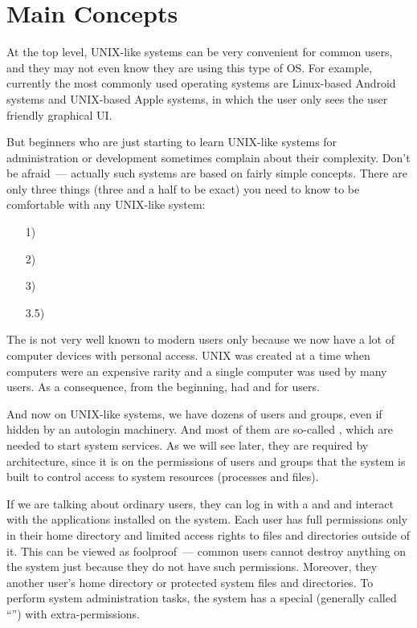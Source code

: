 \section*{Main Concepts}

At the top level, UNIX-like systems can be very convenient for common
users, and they may not even know they are using this type of OS.
For example, currently the most commonly used operating systems are
Linux-based Android systems and UNIX-based Apple systems, in which
the user only sees the user friendly graphical UI.

But beginners who are just starting to learn UNIX-like systems
for administration or development sometimes complain about their complexity.
Don't be afraid~--- actually such systems are based on fairly simple concepts.
There are only three things (three and a half to be exact) you
need to know to be comfortable with any UNIX-like system:
\begin{itemize}
\item[1)] 
\item[2)] 
\item[3)] 
\item[3.5)] 
\end{itemize}

The  is not very well known to modern users only because we now
have a lot of computer devices with personal access. UNIX was created at a time
when computers were an expensive rarity and a single computer was used
by many users. As a consequence, from the beginning,  had
 and 
for users.

And now on UNIX-like systems, we have dozens of users and groups,
even if hidden by an autologin machinery. And most of them are so-called
, which are needed to start system services. As we will see
later, they are required by architecture, since it is on the permissions
of users and groups that the system is built to control access to system
resources (processes and files).

If we are talking about ordinary users, they can log in with a 
and  and interact with the applications installed on the system.
Each user has full permissions only in their home directory and limited
access rights to files and directories outside of it. This can be viewed
as foolproof~--- common users cannot destroy anything on the system just
because they do not have such permissions. Moreover, they 
another user's home directory or protected system files and directories.
To perform system administration tasks, the system has a special
 (generally called ``'') with extra-permissions.

